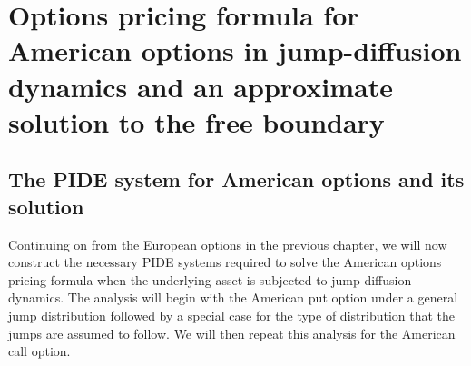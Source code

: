 \chapter{Options pricing formula for American options in jump-diffusion dynamics and an approximate solution to the free boundary}
 
 	\section{The PIDE system for American options and its solution}
   Continuing on from the European options in the previous chapter, we will now construct the necessary PIDE systems required to solve the American options pricing formula when the underlying asset is subjected to jump-diffusion dynamics. The analysis will begin with the American put option under a general jump distribution followed by a special case for the type of distribution that the jumps are assumed to follow. We will then repeat this analysis for the American call option.
   
